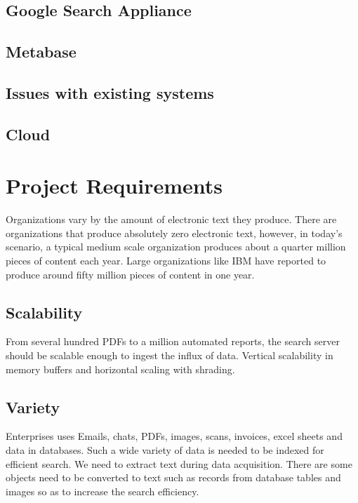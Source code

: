 \documentclass[a4paper,12pt,oneside]{book}
\begin{document}
\section{Google Search Appliance}
\lipsum

\section{Metabase}
\lipsum

\blindtext

\section{Issues with existing systems}
\lipsum[2]

\section{Cloud}
\lipsum[2]

\chapter{Project Requirements}
Organizations vary by the amount of electronic text they produce. There are organizations that produce absolutely zero electronic text, however, in today's scenario, a typical medium scale organization produces about a quarter million pieces of content each year. Large organizations like IBM have reported to produce around fifty million pieces of content in one year.

\lipsum[3]

\section{Scalability}
From several hundred PDFs to a million automated reports, the search server should be scalable enough to ingest the influx of data. Vertical scalability in memory buffers and horizontal scaling with shrading.

\section{Variety}
Enterprises uses Emails, chats, PDFs, images, scans, invoices, excel sheets and data in databases. Such a wide variety of data is needed to be indexed for efficient search. We need to extract text during data acquisition. There are some objects need to be converted to text such as records from database tables and images so as to increase the search efficiency.
\end{document}
